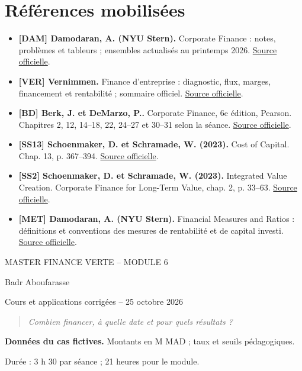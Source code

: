 \documentclass[12pt,a4paper]{article}
\begin{document}
\section*{Références mobilisées}
\small
\begin{itemize}
\item \textbf{[DAM] Damodaran, A. (NYU Stern).} Corporate Finance : notes, problèmes et tableurs ; ensembles actualisés au printemps 2026. \href{https://pages.stern.nyu.edu/~adamodar/New_Home_Page/cflect.htm}{Source officielle}.
\item \textbf{[VER] Vernimmen.} Finance d’entreprise : diagnostic, flux, marges, financement et rentabilité ; sommaire officiel. \href{https://www.vernimmen.fr/Vernimmen/Plan_du_livre.php}{Source officielle}.
\item \textbf{[BD] Berk, J. et DeMarzo, P..} Corporate Finance, 6e édition, Pearson. Chapitres 2, 12, 14--18, 22, 24--27 et 30--31 selon la séance. \href{https://www.pearson.com/en-us/subject-catalog/p/corporate-finance/P200000009791/9780137844906}{Source officielle}.
\item \textbf{[SS13] Schoenmaker, D. et Schramade, W. (2023).} Cost of Capital. Chap. 13, p. 367--394. \href{https://doi.org/10.1007/978-3-031-35009-2_13}{Source officielle}.
\item \textbf{[SS2] Schoenmaker, D. et Schramade, W. (2023).} Integrated Value Creation. Corporate Finance for Long-Term Value, chap. 2, p. 33--63. \href{https://doi.org/10.1007/978-3-031-35009-2_2}{Source officielle}.
\item \textbf{[MET] Damodaran, A. (NYU Stern).} Financial Measures and Ratios : définitions et conventions des mesures de rentabilité et de capital investi. \href{https://pages.stern.nyu.edu/~adamodar/New_Home_Page/definitions.html}{Source officielle}.
\end{itemize}\normalsize
\clearpage
\begin{center}{\small MASTER FINANCE VERTE -- MODULE 6}\par\vspace{8pt}{\Large\bfseries Séance 2 -- Plan financier et trajectoire de transition}\par\vspace{6pt}Badr Aboufarasse\par{\small Cours et applications corrigées -- 25 octobre 2026}\end{center}
\begin{quote}\itshape Combien financer, à quelle date et pour quels résultats ?\end{quote}
\textbf{Données du cas fictives.} Montants en M MAD ; taux et seuils pédagogiques.\par Durée : 3 h 30 par séance ; 21 heures pour le module.
\end{document}
